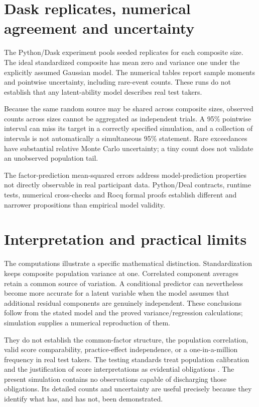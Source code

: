 \chapter{Dask replicates, numerical agreement and uncertainty}
\label{sec:hf-dask-validation}
The Python/Dask experiment pools \SimReplicates{} seeded replicates for each
composite size. The ideal standardized composite has mean zero and
variance one under the explicitly assumed Gaussian model.
The numerical tables report sample moments and pointwise uncertainty,
including rare-event counts. These runs do not establish that any
latent-ability model describes real test takers.

Because the same random source may be shared across composite sizes,
observed counts across sizes cannot be aggregated as independent trials.
A 95\% pointwise interval can miss its target in a correctly specified
simulation, and a collection of intervals is not automatically a
simultaneous 95\% statement. Rare exceedances have substantial relative
Monte Carlo uncertainty; a tiny count does not validate an unobserved
population tail.

The factor-prediction mean-squared errors address model-prediction
properties not directly observable in real participant data. Python/Deal
contracts, runtime tests, numerical cross-checks and Rocq formal proofs
establish different and narrower propositions than empirical model
validity.

\chapter{Interpretation and practical limits}
The computations illustrate a specific mathematical distinction.
Standardization keeps composite population variance at one. Correlated
component averages retain a common source of variation. A conditional
predictor can nevertheless become more accurate for a latent variable
when the model assumes that additional residual components are genuinely
independent. These conclusions follow from the stated model and the
proved variance/regression calculations; simulation supplies a numerical
reproduction of them.

They do not establish the common-factor structure, the population
correlation, valid score comparability, practice-effect independence, or
a one-in-a-million frequency in real test takers. The testing standards
treat population calibration and the justification of score
interpretations as evidential obligations \citep[Standards 1.1--1.4,
1.14 and 5.8--5.9]{standards2014}. The present simulation contains no
observations capable of discharging those obligations. Its detailed
counts and uncertainty are useful precisely because they identify what
has, and has not, been demonstrated.

\appendix




\begingroup
\setlength{\bibsep}{3pt}


\endgroup
\ProjectReportAIAppendix

